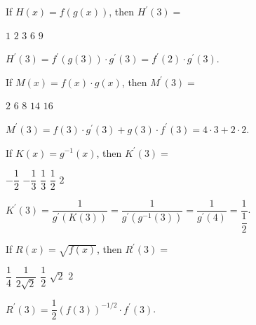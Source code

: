 \question
If $H(x)=f(g(x))$, then $H^{\prime}(3)=$
\begin{choices}
  \choice $1$
  \choice $2$
  \CorrectChoice $3$
  \choice $6$
  \choice $9$
\end{choices}
\begin{solution}
$H^{\prime}(3)=f^{\prime}(g(3)) \cdot g^{\prime}(3)=f^{\prime}(2) \cdot g^{\prime}(3)$.
\end{solution}

\question
If $M(x)=f(x) \cdot g(x)$, then $M^{\prime}(3)=$
\begin{choices}
  \choice $2$
  \choice $6$
  \choice $8$
  \choice $14$
  \CorrectChoice $16$
\end{choices}
\begin{solution}
$M^{\prime}(3)=f(3) \cdot g^{\prime}(3)+g(3) \cdot f^{\prime}(3)=4 \cdot 3+2 \cdot 2$.
\end{solution}

\question
If $K(x)=g^{-1}(x)$, then $K^{\prime}(3)=$
\begin{choices}
  \choice $-\dfrac{1}{2}$
  \choice $-\dfrac{1}{3}$
  \choice $\dfrac{1}{3}$
  \choice $\dfrac{1}{2}$
  \choice $2$
\end{choices}
\begin{solution}
$K^{\prime}(3)=\dfrac{1}{g^{\prime}(K(3))}=\dfrac{1}{g^{\prime}\left(g^{-1}(3)\right)}=\dfrac{1}{g^{\prime}(4)}=\dfrac{1}{\dfrac{1}{2}}$.
\end{solution}

\question\label{calc11:fg-last}
If $R(x)=\sqrt{f(x)}$, then $R^{\prime}(3)=$
\begin{choices}
  \choice $\dfrac{1}{4}$
  \choice $\dfrac{1}{2 \sqrt{2}}$
  \choice $\dfrac{1}{2}$
  \choice $\sqrt{2}$
  \choice $2$
\end{choices}
\begin{solution}
$R^{\prime}(3)=\dfrac{1}{2}(f(3))^{-1 / 2} \cdot f^{\prime}(3)$.
\end{solution}




\newpage





